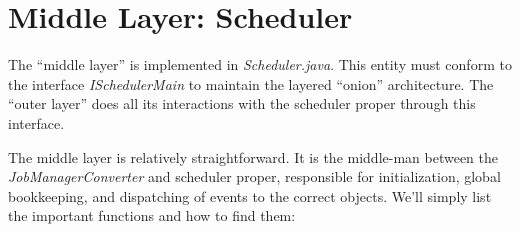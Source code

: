 \section{Middle Layer: Scheduler}

    The ``middle layer'' is implemented in {\em Scheduler.java}.  This entity must conform to the
    interface {\em ISchedulerMain} to maintain the layered ``onion'' architecture.  The ``outer layer''
    does all its interactions with the scheduler proper through this interface.

    The middle layer is relatively straightforward.  It is the middle-man between the {\em JobManagerConverter}
    and scheduler proper, responsible for initialization, global bookkeeping, and dispatching of events
    to the correct objects.  We'll simply list the important functions
    and how to find them:

